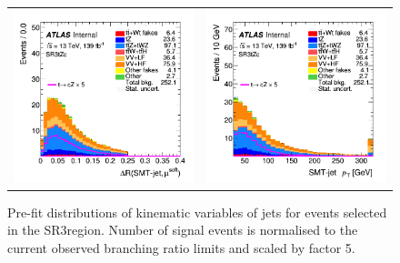 \begin{figure}[htbp]
\begin{tabular}{cc}
		\includegraphics[width=.45\textwidth]{Chapters/CH6/figures/SR3_UsingSMT/softmu_dRmin} &
		\includegraphics[width=.45\textwidth]{Chapters/CH6/figures/SR3_UsingSMT/SMTjet_Pt} \\
	\end{tabular}
	\caption{Pre-fit distributions of kinematic variables of jets for events selected in the SR3\tZc region. Number of signal events is normalised to the current observed branching ratio limits and scaled by factor 5. 
		\ErrStatOnly
		\Blinded
	}%
	\label{fig:sr3_kin_jet}
\end{figure}
\newpage
